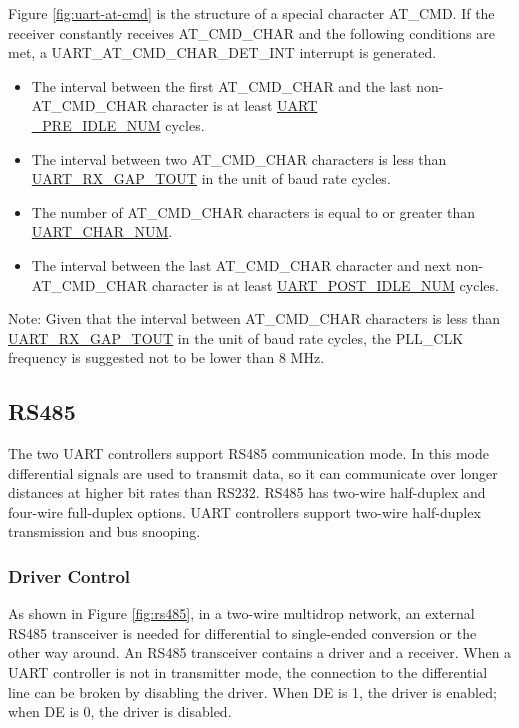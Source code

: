 \documentclass[main\_\_EN.tex]{subfiles}
\begin{document}
Figure \ref{fig:uart-at-cmd} is the structure of a special character AT\_CMD. If the receiver constantly receives AT\_CMD\_CHAR and the following conditions are met, a UART\_AT\_CMD\_CHAR\_DET\_INT interrupt is generated.

\begin{itemize}
    \item The interval between the first AT\_CMD\_CHAR and the last non-AT\_CMD\_CHAR character is at least \hyperref[fielddesc:UARTPREIDLENUM]{UART\\\_PRE\_IDLE\_NUM} cycles.
    \item The interval between two AT\_CMD\_CHAR characters is less than \hyperref[fielddesc:UARTRXGAPTOUT]{UART\_RX\_GAP\_TOUT} in the unit of baud rate cycles.
    \item The number of AT\_CMD\_CHAR characters is equal to or greater than \hyperref[fielddesc:UARTCHARNUM]{UART\_CHAR\_NUM}.
    \item The interval between the last AT\_CMD\_CHAR character and next non-AT\_CMD\_CHAR character is at least \hyperref[fielddesc:UARTPOSTIDLENUM]{UART\_POST\_IDLE\_NUM} cycles.
\end{itemize}

Note: Given that the interval between AT\_CMD\_CHAR characters is less than \hyperref[fielddesc:UARTRXGAPTOUT]{UART\_RX\_GAP\_TOUT} in the unit of baud rate cycles, the PLL\_CLK frequency is suggested not to be lower than 8 MHz.

\subsection{RS485}

The two UART controllers support RS485 communication mode. In this mode differential signals are used to transmit data, so it can communicate over longer distances at higher bit rates than RS232. RS485 has two-wire half-duplex and four-wire full-duplex options. UART controllers support two-wire half-duplex transmission and bus snooping. 

\subsubsection{Driver Control}

As shown in Figure \ref{fig:rs485}, in a two-wire multidrop network, an external RS485 transceiver is needed for differential to single-ended conversion or the other way around. An RS485 transceiver contains a driver and a receiver. When a UART controller is not in transmitter mode, the connection to the differential line can be broken by disabling the driver. When DE is 1, the driver is enabled; when DE is 0, the driver is disabled.
\end{document}
